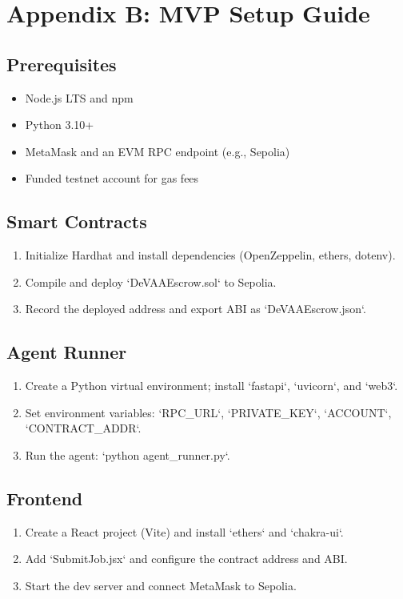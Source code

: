 ﻿\chapter{Appendix B: MVP Setup Guide}
\label{appendix:setup}
\section{Prerequisites}
\begin{itemize}
  \item Node.js LTS and npm
  \item Python 3.10+
  \item MetaMask and an EVM RPC endpoint (e.g., Sepolia)
  \item Funded testnet account for gas fees
\end{itemize}

\section{Smart Contracts}
\begin{enumerate}
  \item Initialize Hardhat and install dependencies (OpenZeppelin, ethers, dotenv).
  \item Compile and deploy `DeVAAEscrow.sol` to Sepolia.
  \item Record the deployed address and export ABI as `DeVAAEscrow.json`.
\end{enumerate}

\section{Agent Runner}
\begin{enumerate}
  \item Create a Python virtual environment; install `fastapi`, `uvicorn`, and `web3`.
  \item Set environment variables: `RPC_URL`, `PRIVATE_KEY`, `ACCOUNT`, `CONTRACT_ADDR`.
  \item Run the agent: `python agent_runner.py`.
\end{enumerate}

\section{Frontend}
\begin{enumerate}
  \item Create a React project (Vite) and install `ethers` and `chakra-ui`.
  \item Add `SubmitJob.jsx` and configure the contract address and ABI.
  \item Start the dev server and connect MetaMask to Sepolia.
\end{enumerate}

